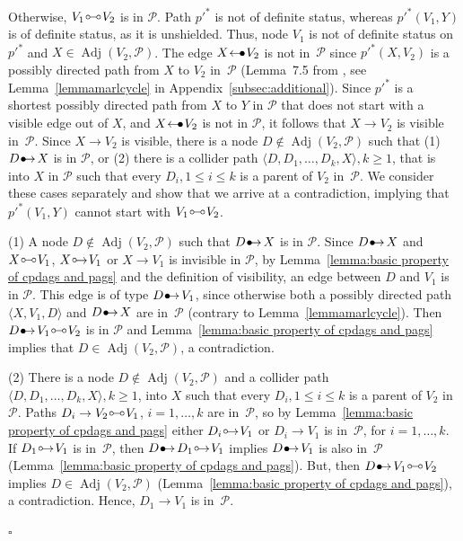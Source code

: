 \documentclass[11pt,a4paper]{article}
\newenvironment{proofof}[1][]{\begin{trivlist}
   \item[\hskip \labelsep {\bfseries Proof of #1.}]}{\hfill{}$\square$\end{trivlist}}
\DeclareMathOperator{\Adj}{Adj}
\newcommand{\g}[1][G]{\mathcal{#1}}
\newcommand{\pstar}[1][p]{{#1}^{*}}
\newcommand{\bulletarrow}{
  \setlength{\unitlength}{1mm}
  \begin{picture}(5,1)(0,0)
    \put(0.2,0){$\bullet$}
    \put(1,0){$\rightarrow$}
  \end{picture}
}
\newcommand{\arrowbullet}{
  \setlength{\unitlength}{1mm}
  \begin{picture}(5,1)(0,0)
    \put(0.2,0){$\leftarrow$}
    \put(3,0){$\bullet$}
  \end{picture}
}
\newcommand{\circarrow}{
  \setlength{\unitlength}{1mm}
  \begin{picture}(5,1)(0,0)
    \put(1,1){\circle{1}}
    \put(1.2,0){$\rightarrow$}
  \end{picture}
}
\newcommand{\circcirc}{
  \setlength{\unitlength}{1mm}
  \begin{picture}(5,1)(0,0)
    \put(1,1){\circle{1}}
    \put(1.5,1){\line(1,0){2}}
    \put(4,1){\circle{1}}
  \end{picture}
}
\begin{document}
\begin{proofof}[Lemma~\ref{lemmadirectedpath}]
  Otherwise, $V_1 \circcirc V_2$ is in $\g[P]$.
   Path $\pstar[p']$ is not of definite status, whereas $\pstar[p'](V_{1},Y)$ is of definite status, as it is unshielded. Thus, node $V_1$ is not of definite status on $\pstar[p']$ and $X \in \Adj(V_2,\g[P])$. The edge $X \arrowbullet V_2$ is not in~$\g[P]$ since $\pstar[p'](X,V_2)$ is a possibly directed path from $X$ to $V_2$  in~$\g[P]$ (Lemma~7.5 from \citet{maathuis2013generalized}, see Lemma~\ref{lemmamarlcycle} in Appendix~\ref{subsec:additional}). Since $\pstar[p']$ is a shortest possibly directed path from $X$ to $Y$ in $\g[P]$ that does not start with a visible edge out of $X$, and $X \arrowbullet V_2$ is not in $\g[P]$, it follows that $X \to V_2$ is visible in~$\g[P]$.
   Since $X \to V_2$ is visible, there is a node $D \notin \Adj(V_2,\g[P])$ such that (1) $D \bulletarrow X$ is in $\g[P]$, or (2) there is a collider path $\langle D,D_1,\dots,D_k,X \rangle, k \ge 1$, that is into $X$ in $\g[P]$ such that every $D_i, 1 \le i \le k$ is a parent of $V_{2}$ in~$\g[P]$. We consider these cases separately and show that we arrive at a contradiction, implying that $\pstar[p'](V_1,Y)$ cannot start with $V_1 \circcirc V_2$.

(1) A node $D \notin \Adj(V_2,\g[P])$ such that $D \bulletarrow X$ is in $\g[P]$. Since $D \bulletarrow X$ and $X \circcirc V_1$, $X \circarrow V_1$ or $X \rightarrow V_1$ is invisible in $\g[P]$, by Lemma~\ref{lemma:basic property of cpdags and pags} and the definition of visibility, an edge between $D$ and $V_1$ is in $\g[P]$. This edge is of type $D \bulletarrow V_1$, since otherwise both a possibly directed path $\langle X,V_1,D \rangle$ and $D \bulletarrow X$ are in~$\g[P]$ (contrary to Lemma~\ref{lemmamarlcycle}). Then $D \bulletarrow V_1 \circcirc V_2$ is in $\g[P]$ and Lemma~\ref{lemma:basic property of cpdags and pags} implies that $D \in \Adj(V_2,\g[P])$, a contradiction.

(2) There is a node $D \notin \Adj(V_2,\g[P])$ and a collider path $\langle D,D_1,\dots,D_k,X \rangle, k \ge 1$, into $X$ such that every $D_i, 1 \le i \le k$ is a parent of $V_{2}$ in~$\g[P]$. Paths $D_{i} \to V_{2} \circcirc V_{1}$, $i=1,\dots,k$ are in~$\g[P]$, so by Lemma~\ref{lemma:basic property of cpdags and pags} either $D_{i} \circarrow V_{1}$ or $D_{i} \rightarrow V_{1}$ is in~$\g[P]$, for $i =1,\dots,k$. 
   If $D_{1} \circarrow V_{1}$ is in~$\g[P]$, then $ D \bulletarrow D_1 \circarrow V_1$ implies $D \bulletarrow V_1$ is also in~$\g[P]$ (Lemma~\ref{lemma:basic property of cpdags and pags}). But, then $D \bulletarrow V_1 \circcirc V_2$ implies $D \in \Adj(V_2,\g[P])$ (Lemma~\ref{lemma:basic property of cpdags and pags}), a contradiction.
  Hence, $D_{1} \to V_{1}$ is in~$\g[P]$.


\end{proofof}
\end{document}
